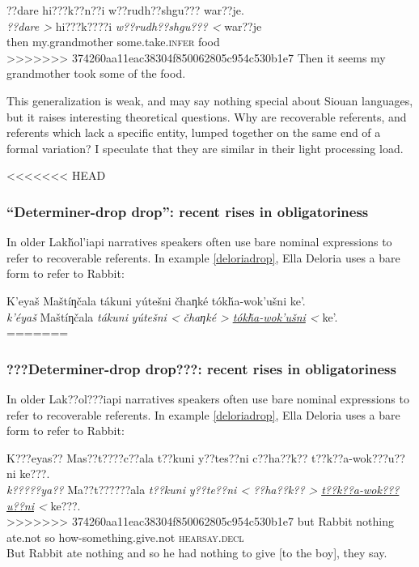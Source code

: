 \documentclass[output=paper]{LSP/langsci}
\begin{document}
\ea\label{wansigechemidrop}
??dare hi???k??n??i w??rudh??shgu??? war??je.\footnotemark\\
\gll	\emph{??dare >} 		hi???k????i 				\emph{w??rudh??shgu??? <}	war??je\\
	then 				my.grandmother 			some.take.\textsc{infer}	food\\
>>>>>>> 374260aa11eac38304f850062805c954c530b1e7
\glt	Then it seems my grandmother took some of the food.
\z

This generalization is weak, and may say nothing special about Siouan languages, but it raises interesting theoretical questions. Why are recoverable referents, and referents which lack a specific entity, lumped together on the same end of a formal variation? I speculate that they are similar in their light processing load.

<<<<<<< HEAD
\subsubsection{“Determiner-drop drop”: recent rises in obligatoriness}\label{determinerdropdrop}

	In older Lakȟol’iapi narratives speakers often use bare nominal expressions to refer to recoverable referents. In example \ref{deloriadrop}, Ella Deloria uses a bare form to refer to Rabbit:
	
\ea\label{deloriadrop}
	K’eyaš Maštíƞčala tákuni yútešni čhaƞké tókȟa-wok’ušni ke’.\footnotemark\\
\gll	\emph{k’éyaš} 	Maštíƞčala 	\emph{tákuni} 	\emph{yútešni <}	 \emph{čhaƞké >} 	\emph{\underline{tókȟa-wok’ušni} <}		ke’. \\
=======
\subsubsection{???Determiner-drop drop???: recent rises in obligatoriness}\label{determinerdropdrop}

	In older Lak??ol???iapi narratives speakers often use bare nominal expressions to refer to recoverable referents. In example \ref{deloriadrop}, Ella Deloria uses a bare form to refer to Rabbit:
	
\ea\label{deloriadrop}
	K???eyas?? Mas??t????c??ala t??kuni y??tes??ni c??ha??k?? t??k??a-wok???u??ni ke???.\footnotemark\\
\gll	\emph{k?????ya??} 	Ma??t??????ala 	\emph{t??kuni} 	\emph{y??te??ni <}	 \emph{??ha??k?? >} 	\emph{\underline{t??k??a-wok???u??ni} <}		ke???. \\
>>>>>>> 374260aa11eac38304f850062805c954c530b1e7
	but 			Rabbit		nothing	 	ate.not	 	 so 			 how-something.give.not 				\textsc{hearsay.decl}\\
\glt	But Rabbit ate nothing and so he had nothing to give [to the boy], they say.
\z
\end{document}
